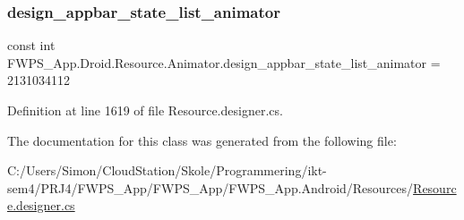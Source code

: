 \subsubsection{\texorpdfstring{design\+\_\+appbar\+\_\+state\+\_\+list\+\_\+animator}{design\_appbar\_state\_list\_animator}}
{\footnotesize\ttfamily const int F\+W\+P\+S\+\_\+\+App.\+Droid.\+Resource.\+Animator.\+design\+\_\+appbar\+\_\+state\+\_\+list\+\_\+animator = 2131034112}



Definition at line 1619 of file Resource.\+designer.\+cs.



The documentation for this class was generated from the following file\+:\begin{DoxyCompactItemize}
\item 
C\+:/\+Users/\+Simon/\+Cloud\+Station/\+Skole/\+Programmering/ikt-\/sem4/\+P\+R\+J4/\+F\+W\+P\+S\+\_\+\+App/\+F\+W\+P\+S\+\_\+\+App/\+F\+W\+P\+S\+\_\+\+App.\+Android/\+Resources/\mbox{\hyperlink{_resource_8designer_8cs}{Resource.\+designer.\+cs}}\end{DoxyCompactItemize}
